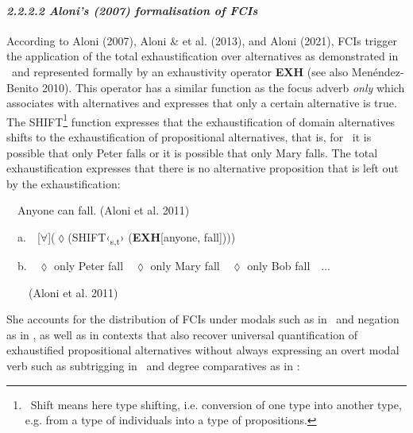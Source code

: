 \paragraph[2.2.2.2 Aloni’s (2007) formalisation of FCIs]{\textit{2.2.2.2 Aloni’s (2007) formalisation of FCIs}}
\begin{styleStandard}
According to Aloni (2007), Aloni \& et al. (2013), and Aloni (2021), FCIs trigger the application of the total exhaustification over alternatives as demonstrated in \ and represented formally by an exhaustivity operator \textbf{EXH} (see also Menéndez-Benito 2010). This operator has a similar function as the focus adverb \textit{only} which associates with alternatives and expresses that only a certain alternative is true. The SHIFT\footnote{\ Shift means here type shifting, i.e. conversion of one type into another type, e.g. from a type of individuals into a type of propositions. } function expresses that the exhaustification of domain alternatives shifts to the exhaustification of propositional alternatives, that is, for \ it is possible that only Peter falls or it is possible that only Mary falls. The total exhaustification expresses that there is no alternative proposition that is left out by the exhaustification:
\end{styleStandard}

\begin{styleStandard}
\label{bkm:Ref150778689}\ \ Anyone can fall. (Aloni et al. 2011)
\end{styleStandard}

\begin{styleStandard}
\ \ a.\ \ [${\forall}$](${\lozenge}$(\textsc{SHIFT}‹\textsubscript{s,t}›\textsubscript{ }(\textbf{EXH}[anyone, fall])))
\end{styleStandard}

\begin{styleStandard}
\ \ b.\ \ ${\lozenge}$ only Peter fall\ \ ${\lozenge}$ only Mary fall\ \ ${\lozenge}$ only Bob fall\ \ ...
\end{styleStandard}

\begin{styleStandard}
\ \ \ \ (Aloni et al. 2011)
\end{styleStandard}

\begin{styleStandard}
She accounts for the distribution of FCIs under modals such as in \ and negation as in , as well as in contexts that also recover universal quantification of exhaustified propositional alternatives without always expressing an overt modal verb such as subtrigging in \ and degree comparatives as in :
\end{styleStandard}


